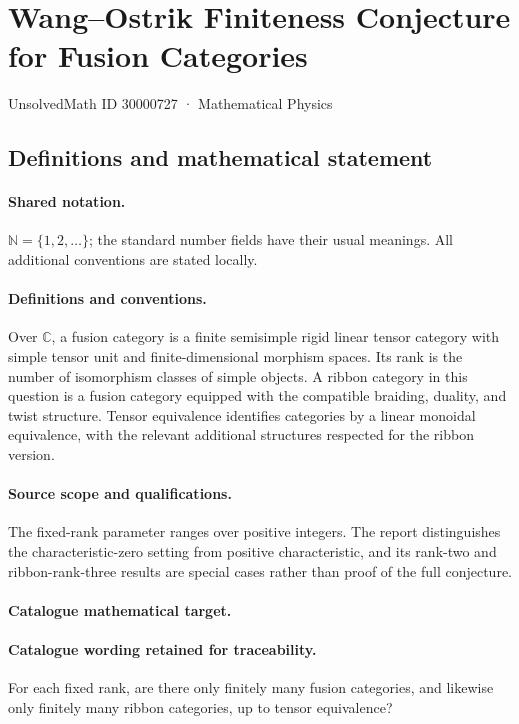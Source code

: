 \documentclass[11pt]{article}
\begin{document}
\setcounter{section}{30000726}
\section{Wang–Ostrik Finiteness Conjecture for Fusion Categories}\label{30000727}
{\small UnsolvedMath ID 30000727 · Mathematical Physics}
\subsection{Definitions and mathematical statement}

\paragraph{Shared notation.}$\mathbb N=\{1,2,\ldots\}$; the standard number fields have their usual meanings. All additional conventions are stated locally.


\paragraph{Definitions and conventions.} Over $\mathbb C$, a fusion category is a finite semisimple rigid linear tensor category with simple tensor unit and finite-dimensional morphism spaces. Its rank is the number of isomorphism classes of simple objects. A ribbon category in this question is a fusion category equipped with the compatible braiding, duality, and twist structure. Tensor equivalence identifies categories by a linear monoidal equivalence, with the relevant additional structures respected for the ribbon version.

\paragraph{Source scope and qualifications.} The fixed-rank parameter ranges over positive integers. The report distinguishes the characteristic-zero setting from positive characteristic, and its rank-two and ribbon-rank-three results are special cases rather than proof of the full conjecture.

\paragraph{Catalogue mathematical target.}
\paragraph{Catalogue wording retained for traceability.}
For each fixed rank, are there only finitely many fusion categories, and likewise only finitely many ribbon categories, up to tensor equivalence?
\end{document}
